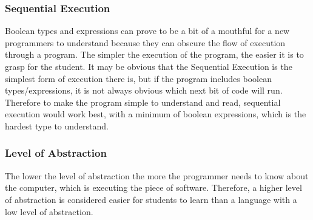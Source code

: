 \subsubsection{Sequential Execution}

Boolean types and expressions can prove to be a bit of a mouthful for a new programmers to understand because they can obscure the flow of execution through a program.
The simpler the execution of the program, the easier it is to grasp for the student.
It may be obvious that the Sequential Execution is the simplest form of execution there is, but if the program includes boolean types/expressions, it is not always obvious which next bit of code will run.
Therefore to make the program simple to understand and read, sequential execution would work best, with a minimum of boolean expressions, which is the hardest type to understand.

\subsubsection{Level of Abstraction}

The lower the level of abstraction the more the programmer needs to know about the computer, which is executing the piece of software.
Therefore, a higher level of abstraction is considered easier for students to learn than a language with a low level of abstraction.